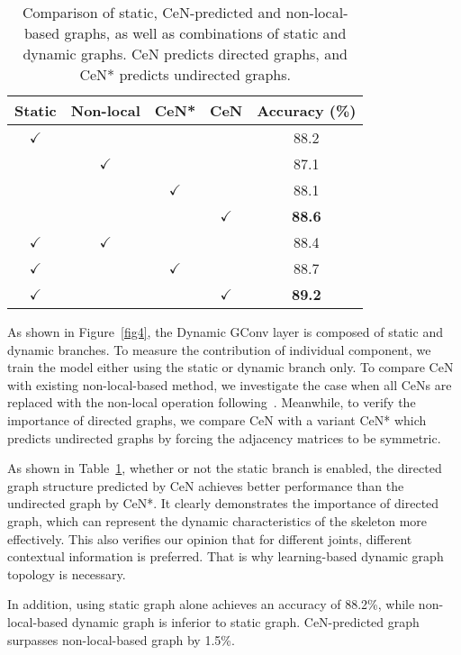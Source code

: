 \documentclass[sigconf]{acmart}
\begin{document}
\begin{table}[t]
  \caption{Comparison of static, CeN-predicted and non-local-based graphs, as well as combinations of static and dynamic graphs. CeN predicts directed graphs, and CeN* predicts undirected graphs.}
  \label{table1}\begin{tabular}{c|c|c|c|c}
    \toprule
    Static & Non-local & CeN*  & CeN   & Accuracy (\%)  \\
    \midrule
    $\checkmark$     &       &       &       & 88.2 \\
          & $\checkmark$     &       &       & 87.1 \\
          &       & $\checkmark$     &       & 88.1 \\
          &       &       & $\checkmark$     & \textbf{88.6} \\
    \midrule
    $\checkmark$     & $\checkmark$     &       &       & 88.4 \\
    $\checkmark$     &       & $\checkmark$     &       & 88.7 \\
    $\checkmark$     &       &       & $\checkmark$     & \textbf{89.2} \\
    \bottomrule
    \end{tabular}\end{table}

As shown in Figure~\ref{fig4}, the Dynamic GConv layer is composed of static and dynamic branches. To measure the contribution of individual component, we train the model either using the static or dynamic branch only. To compare CeN with existing non-local-based method, we investigate the case when all CeNs are replaced with the non-local operation following~\cite{shi2019two}. Meanwhile, to verify the importance of directed graphs, we compare CeN with a variant CeN* which predicts undirected graphs by forcing the adjacency matrices to be symmetric.

As shown in Table~\ref{table1}, whether or not the static branch is enabled, the directed graph structure predicted by CeN achieves better performance than the undirected graph by CeN*. It clearly demonstrates the importance of directed graph, which can represent the dynamic characteristics of the skeleton more effectively. This also verifies our opinion that for different joints, different contextual information is preferred. That is why learning-based dynamic graph topology is necessary.

In addition, using static graph alone achieves an accuracy of 88.2\%, while non-local-based dynamic graph is inferior to static graph. CeN-predicted graph surpasses non-local-based graph by 1.5\%.
\end{document}
